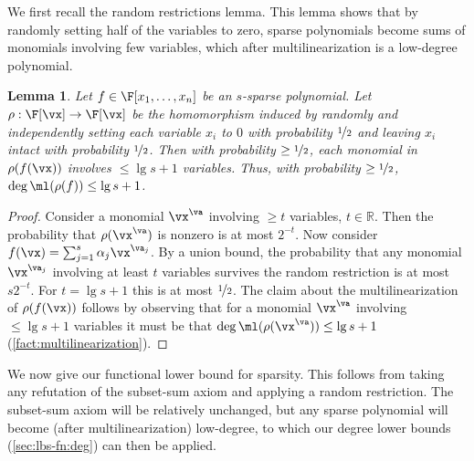\documentclass[11pt]{article}
\numberwithin{equation}{section}
\newtheorem{lemma}[theorem]{Lemma}
\theoremstyle{definition}
\theoremstyle{plain}
\newcommand{\R}{\mathbb R}
\begin{document}
We first recall the random restrictions lemma.  This lemma shows that by randomly setting half of the variables to zero, sparse polynomials become sums of monomials involving few variables, which after multilinearization is a low-degree polynomial.

\begin{lemma}\label{res:random-restriction}
        Let $f\in\F[x_1,\ldots,x_n]$ be an $s$-sparse polynomial.  Let $\rho:\F[\vx]\to\F[\vx]$ be the homomorphism induced by randomly and independently setting each variable $x_i$ to $0$ with probability $\nicefrac{1}{2}$ and leaving $x_i$ intact with probability $\nicefrac{1}{2}$.  Then with probability $\ge \nicefrac{1}{2}$, each monomial in $\rho(f(\vx))$ involves $\le \lg s+1$ variables.  Thus, with probability $\ge \nicefrac{1}{2}$, $\deg\ml(\rho(f))\le \lg s+1$.
\end{lemma}
\begin{proof}
        Consider a monomial $\vx^\va$ involving $\ge t$ variables, $t\in\R$.  Then the probability that $\rho(\vx^\va)$ is nonzero is at most $2^{-t}$.  Now consider $f(\vx)=\sum_{j=1}^s \alpha_j \vx^{\va_j}$. By a union bound, the probability that any monomial $\vx^{\va_j}$ involving at least $t$ variables survives the random restriction is at most $s2^{-t}$. For $t=\lg s+1$ this is at most $\nicefrac{1}{2}$.  The claim about the multilinearization of $\rho(f(\vx))$ follows by observing that for a monomial $\vx^\va$ involving $\le \lg s+1$ variables it must be that $\deg\ml(\rho(\vx^\va))\le \lg s+1$ (\autoref{fact:multilinearization}).
\end{proof}

We now give our functional lower bound for sparsity.  This follows from taking any refutation of the subset-sum axiom and applying a random restriction.  The subset-sum axiom will be relatively unchanged, but any sparse polynomial will become (after multilinearization) low-degree, to which our degree lower bounds (\autoref{sec:lbs-fn:deg}) can then be applied.
\end{document}
